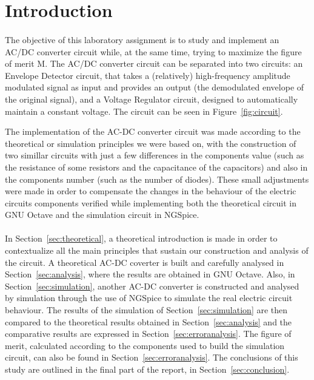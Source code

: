 \pagebreak

\section{Introduction}
\label{sec:introduction}

\paragraph{} 
The objective of this laboratory assignment is to study and implement an AC/DC converter circuit while, at the same time, trying to maximize the figure of merit M. The AC/DC converter circuit can be separated into two circuits: an Envelope Detector circuit, that takes a (relatively) high-frequency amplitude modulated signal as input and provides an output (the demodulated envelope of the original signal), and a Voltage Regulator circuit, designed to automatically maintain a constant voltage. The circuit can be seen in Figure~\ref{fig:circuit}.


The implementation of the AC-DC converter circuit was made according to the theoretical or simulation principles we were based on, with the construction of two simillar circuits with just a few differences in the components value (such as the resistance of some resistors and the capacitance of the capacitors) and also in the components number (such as the number of diodes). These small adjustments were made in order to compensate the changes in the behaviour of the electric circuits components verified while implementing both the theoretical circuit in GNU Octave and the simulation circuit in NGSpice.



\paragraph{}
In Section~\ref{sec:theoretical}, a theoretical introduction is made in order to contextualize all the main principles that sustain our construction and analysis of the circuit. A theoretical AC-DC coverter is built and carefully analysed in Section~\ref{sec:analysis}, where the results are obtained in GNU Octave. Also, in Section~\ref{sec:simulation}, another AC-DC converter is constructed and analysed by simulation through the use of NGSpice to simulate the real electric circuit behaviour. The results of the simulation of Section~\ref{sec:simulation} are then compared to the theoretical results obtained in Section~\ref{sec:analysis} and the comparative results are expressed in Section~\ref{sec:erroranalysis}. The figure of merit, calculated according to the components used to build the simulation circuit, can also be found in Section~\ref{sec:erroranalysis}. The conclusions of this study are outlined in the final part of the report, in Section~\ref{sec:conclusion}.


